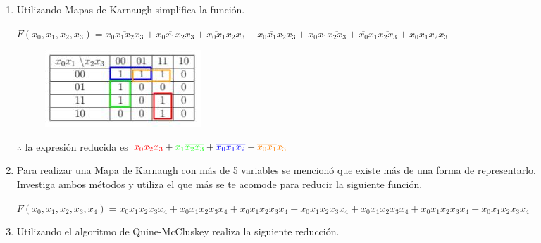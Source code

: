 \documentclass[a4paper,12pt]{article}
\begin{document}
\begin{enumerate}[label=\textcolor{teal}{\textbf{\arabic*.}}]
    \item Utilizando Mapas de Karnaugh simplifica la función.\\
    
        \begin{center}
            $F(x_0,x_1,x_2,x_3) =
            \overline{x_0 x_1 x_2 x_3} 
            +\overline{x_0 x_1 x_2} x_3
            +\overline{x_0 x_1} x_2 x_3
            +x_0 \overline{x_1} x_2 x_3
            + x_0 x_1 \overline{x_2 x_3}
            + \overline{x_0} x_1 \overline{x_2 x_3}
            +x_0 x_1 x_2 x_3
            $
        \end{center}
        
        \begin{figure}[h]
            \centering
            \includegraphics[width=5 cm]{img/mapa9.jpg}
        \end{figure}
        
        $ \therefore$ la expresión reducida es $\textcolor{red}{x_0 x_2 x_3} + \textcolor{green}{x_1 \overline{x_2 x_3}} + \textcolor{blue}{\overline{x_0 x_1 x_2}} + \textcolor{orange}{\overline{x_0 x_1} x_3}$

    \item Para realizar una Mapa de Karnaugh con más de 5 variables se mencionó que existe más de
    una forma de representarlo.\\
    Investiga ambos métodos y utiliza el que más se te acomode para reducir la siguiente función.

    \begin{center}
        $F(x_0,x_1,x_2,x_3,x_4) = 
        \overline{x_0 x_1 x_2 x_3 x_4} 
        + \overline{x_0 x_1 x_2} x_3 \overline{x_4} 
        + \overline{x_0 x_1} x_2 x_3 \overline{x_4} 
        + x_0 \overline{x_1} x_2 x_3 x_4
        + x_0 x_1 \overline{x_2 x_3} x_4
        + \overline{x_0} x_1 \overline{x_2 x_3} x_4
        + x_0 x_1 x_2 x_3 x_4 
        $
    \end{center}
   
    \item Utilizando el algoritmo de Quine-McCluskey realiza la siguiente reducción.\\


\end{enumerate}
\end{document}
